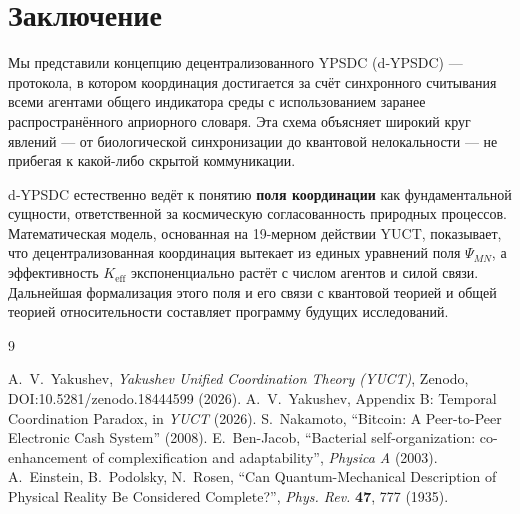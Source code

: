 \documentclass[11pt,a4paper]{article}
\begin{document}
	\section{Заключение}
	
	Мы представили концепцию децентрализованного YPSDC (d‑YPSDC) — протокола, в котором координация достигается за счёт синхронного считывания всеми агентами общего индикатора среды с использованием заранее распространённого априорного словаря. Эта схема объясняет широкий круг явлений — от биологической синхронизации до квантовой нелокальности — не прибегая к какой-либо скрытой коммуникации.
	
	d‑YPSDC естественно ведёт к понятию \textbf{поля координации} как фундаментальной сущности, ответственной за космическую согласованность природных процессов. Математическая модель, основанная на 19-мерном действии YUCT, показывает, что децентрализованная координация вытекает из единых уравнений поля \(\Psi_{MN}\), а эффективность \(K_{\mathrm{eff}}\) экспоненциально растёт с числом агентов и силой связи. Дальнейшая формализация этого поля и его связи с квантовой теорией и общей теорией относительности составляет программу будущих исследований.
	
	\begin{thebibliography}{9}
		\begin{otherlanguage}{english}
			 A.~V.~Yakushev, \emph{Yakushev Unified Coordination Theory (YUCT)}, Zenodo, DOI:10.5281/zenodo.18444599 (2026).
			 A.~V.~Yakushev, Appendix B: Temporal Coordination Paradox, in \emph{YUCT} (2026).
			 S.~Nakamoto, ``Bitcoin: A Peer-to-Peer Electronic Cash System'' (2008).
			 E.~Ben-Jacob, ``Bacterial self-organization: co-enhancement of complexification and adaptability'', \emph{Physica A} (2003).
			 A.~Einstein, B.~Podolsky, N.~Rosen, ``Can Quantum-Mechanical Description of Physical Reality Be Considered Complete?'', \emph{Phys. Rev.} \textbf{47}, 777 (1935).
		\end{otherlanguage}
	\end{thebibliography}
	
\end{document}
